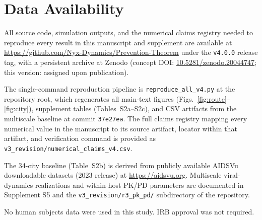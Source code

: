 \documentclass[10pt,letterpaper]{article}
\theoremstyle{definition}
\theoremstyle{remark}
\begin{document}
\section*{Data Availability}

All source code, simulation outputs, and the numerical claims registry
needed to reproduce every result in this manuscript and supplement are
available at \url{https://github.com/Nyx-Dynamics/Prevention-Theorem}
under the \texttt{v4.0.0} release tag, with a persistent archive at
Zenodo (concept DOI: \href{https://doi.org/10.5281/zenodo.20044747}{10.5281/zenodo.20044747};
this version: assigned upon publication).

The single-command reproduction pipeline is \texttt{reproduce\_all\_v4.py}
at the repository root, which regenerates all main-text figures
(Figs.~\ref{fig:route}--\ref{fig:city}), supplement tables
(Tables~S2a--S2c), and CSV
artifacts from the multiscale baseline at commit \texttt{37e27ea}. The
full claims registry mapping every numerical value in the manuscript
to its source artifact, locator within that artifact, and verification
command is provided as \texttt{v3\_revision/numerical\_claims\_v4.csv}.

The 34-city baseline (Table~S2b) is derived from
publicly available AIDSVu downloadable datasets (2023 release) at
\url{https://aidsvu.org}. Multiscale viral-dynamics realizations and
within-host PK/PD parameters are documented in Supplement S5 and the
\texttt{v3\_revision/r3\_pk\_pd/} subdirectory of the repository.

No human subjects data were used in this study. IRB approval was not
required.

\renewcommand{\refname}{\large\textbf{References and Notes}}
\end{document}
